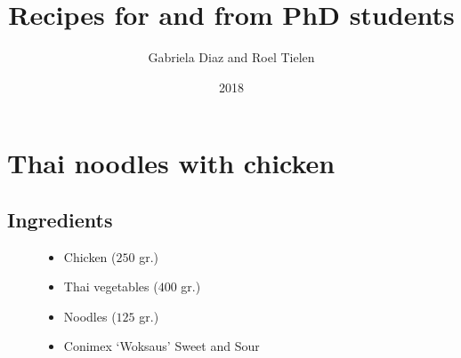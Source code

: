 \documentclass[a4paper,12pt]{report}
\title{Recipes for and from PhD students}
\date{2018\\ }
\author{Gabriela Diaz and Roel Tielen}
\begin{document}
\maketitle
\tableofcontents

\chapter{Thai noodles with chicken}

\section*{Ingredients}
\begin{figure}[h]

\begin{minipage}{0.59\textwidth}
\begin{itemize}
\item Chicken ($250$ gr.)
\item Thai vegetables ($400$ gr.)
\item Noodles ($125$ gr.)
\item Conimex `Woksaus' Sweet and Sour
\end{itemize}
\end{minipage}
\begin{minipage}{0.4\textwidth}


\end{minipage}
\end{figure}
\end{document}
